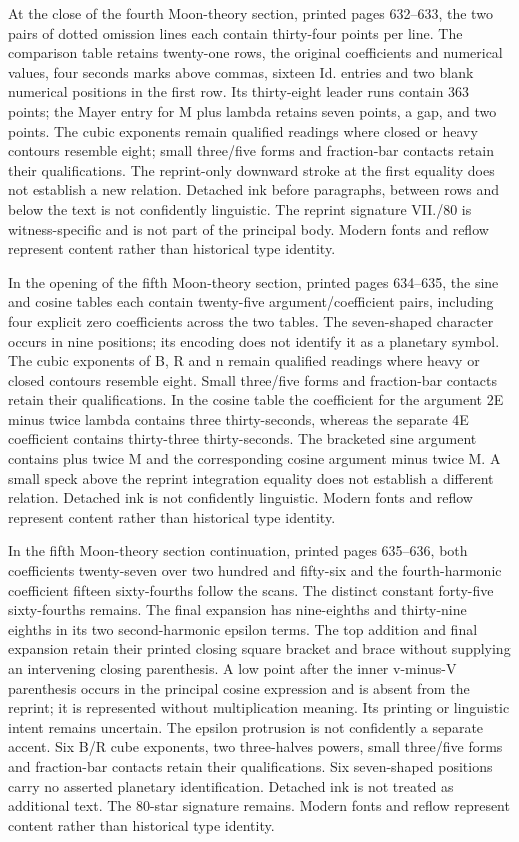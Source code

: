 At the close of the fourth Moon-theory section, printed pages 632--633, the two pairs of dotted omission lines each contain thirty-four points per line. The comparison table retains twenty-one rows, the original coefficients and numerical values, four seconds marks above commas, sixteen Id. entries and two blank numerical positions in the first row. Its thirty-eight leader runs contain 363 points; the Mayer entry for M plus lambda retains seven points, a gap, and two points. The cubic exponents remain qualified readings where closed or heavy contours resemble eight; small three/five forms and fraction-bar contacts retain their qualifications. The reprint-only downward stroke at the first equality does not establish a new relation. Detached ink before paragraphs, between rows and below the text is not confidently linguistic. The reprint signature VII./80 is witness-specific and is not part of the principal body. Modern fonts and reflow represent content rather than historical type identity.

In the opening of the fifth Moon-theory section, printed pages 634--635, the sine and cosine tables each contain twenty-five argument/coefficient pairs, including four explicit zero coefficients across the two tables. The seven-shaped character occurs in nine positions; its encoding does not identify it as a planetary symbol. The cubic exponents of B, R and n remain qualified readings where heavy or closed contours resemble eight. Small three/five forms and fraction-bar contacts retain their qualifications. In the cosine table the coefficient for the argument 2E minus twice lambda contains three thirty-seconds, whereas the separate 4E coefficient contains thirty-three thirty-seconds. The bracketed sine argument contains plus twice M and the corresponding cosine argument minus twice M. A small speck above the reprint integration equality does not establish a different relation. Detached ink is not confidently linguistic. Modern fonts and reflow represent content rather than historical type identity.

In the fifth Moon-theory section continuation, printed pages 635--636, both coefficients twenty-seven over two hundred and fifty-six and the fourth-harmonic coefficient fifteen sixty-fourths follow the scans. The distinct constant forty-five sixty-fourths remains. The final expansion has nine-eighths and thirty-nine eighths in its two second-harmonic epsilon terms. The top addition and final expansion retain their printed closing square bracket and brace without supplying an intervening closing parenthesis. A low point after the inner v-minus-V parenthesis occurs in the principal cosine expression and is absent from the reprint; it is represented without multiplication meaning. Its printing or linguistic intent remains uncertain. The epsilon protrusion is not confidently a separate accent. Six B/R cube exponents, two three-halves powers, small three/five forms and fraction-bar contacts retain their qualifications. Six seven-shaped positions carry no asserted planetary identification. Detached ink is not treated as additional text. The 80-star signature remains. Modern fonts and reflow represent content rather than historical type identity.

